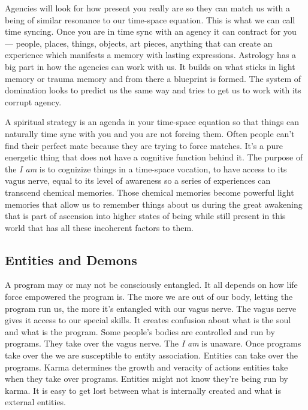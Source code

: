 Agencies will look for how present you really are so they can match us
with a being of similar resonance to our time-space equation. This is
what we can call time syncing. Once you are in time sync with an agency
it can contract for you --- people, places, things, objects, art pieces,
anything that can create an experience which manifests a memory with
lasting expressions. Astrology has a big part in how the agencies can
work with us. It builds on what sticks in light memory or trauma memory
and from there a blueprint is formed. The system of domination looks to
predict us the same way and tries to get us to work with its corrupt
agency.

A spiritual strategy is an agenda in your time-space equation so that
things can naturally time sync with you and you are not forcing them.
Often people can't find their perfect mate because they are trying to
force matches. It's a pure energetic thing that does not have a
cognitive function behind it. The purpose of the \emph{I am} is to
cognizize things in a time-space vocation, to have access to its vagus
nerve, equal to its level of awareness so a series of experiences can
transcend chemical memories. Those chemical memories become powerful
light memories that allow us to remember things about us during the
great awakening that is part of ascension into higher states of being
while still present in this world that has all these incoherent factors
to them.

\subsection{Entities and Demons}\label{entities-and-demons}

A program may or may not be consciously entangled. It all depends on how
life force empowered the program is. The more we are out of our body,
letting the program run us, the more it's entangled with our vagus
nerve. The vagus nerve gives it access to our special skills. It creates
confusion about what is the soul and what is the program. Some people's
bodies are controlled and run by programs. They take over the vagus
nerve. The \emph{I am} is unaware. Once programs take over the we are
susceptible to entity association. Entities can take over the programs.
Karma determines the growth and veracity of actions entities take when
they take over programs. Entities might not know they're being run by
karma. It is easy to get lost between what is internally created and
what is external entities.

